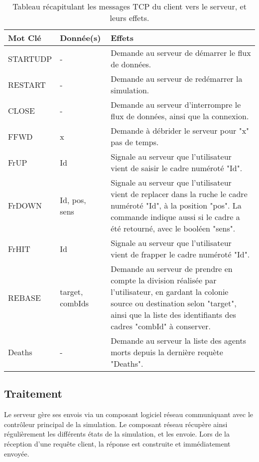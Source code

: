 	
	\begin{table}
		\begin{tabularx}{\textwidth}{|l|l|X|}
		\hline
		\textbf{Mot Clé }& \textbf{Donnée(s)} & \textbf{Effets}\\
		\hline
		STARTUDP & - & Demande au serveur de démarrer le flux de données.\\
		\hline
		RESTART & - & Demande au serveur de redémarrer la simulation.\\
		\hline
		CLOSE & - & Demande au serveur d'interrompre le flux de données, ainsi que la connexion.\\
		\hline
		FFWD & x & Demande à débrider le serveur pour "x" pas de temps.\\
		\hline
		FrUP & Id & Signale au serveur que l'utilisateur vient de saisir le cadre numéroté "Id".\\
		\hline
		FrDOWN & Id, pos, sens & Signale au serveur que l'utilisateur vient de replacer dans la ruche le cadre numéroté "Id", à la position "pos". La commande indique aussi si le cadre a été retourné, avec le booléen "sens".\\
		\hline
		FrHIT & Id & Signale au serveur que l'utilisateur vient de frapper le cadre numéroté "Id".\\
		\hline
		REBASE & target, {combIds} & Demande au serveur de prendre en compte la division réalisée par l'utilisateur, en gardant la colonie source ou destination selon "target", ainsi que la liste des identifiants des cadres "combId" à conserver.\\
		\hline
		Deaths & - & Demande au serveur la liste des agents morts depuis la dernière requète "Deaths".\\
		\hline
		\end{tabularx}
	\caption{Tableau récapitulant les messages TCP du client vers le serveur, et leurs effets.}
	\label{tabClientServ}
	\end{table}
	
	\subsection{Traitement}
	Le serveur gère ses envois via un composant logiciel réseau communiquant avec le contrôleur principal de la simulation. Le composant réseau récupère ainsi régulièrement les différents états de la simulation, et les envoie. Lors de la réception d'une requête client, la réponse est construite et immédiatement envoyée.
	
